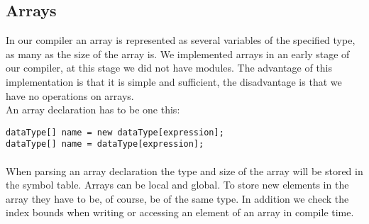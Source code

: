 \subsection{Arrays}
\label{labelArrays}
In our compiler an array is represented as several variables of the specified type, as many as the size of the array is. We implemented arrays
in an early stage of our compiler, at this stage we did not have modules. The advantage of this implementation is that it is simple and
sufficient, the disadvantage is that we have no operations on arrays. \\
An array declaration has to be one this:
\begin{lstlisting}[caption={array declaration}]
dataType[] name = new dataType[expression];
dataType[] name = dataType[expression];
\end{lstlisting}
\paragraph{}When parsing an array declaration the type and size of the array will be stored in the symbol table. Arrays can be
local and global. To store new elements in the array they have to be, of course, be of the same type. In addition we check the
index bounds when writing or accessing an element of an array in compile time.  



